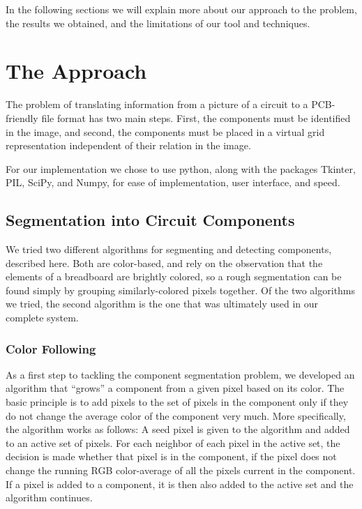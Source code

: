 \documentclass[10pt,twocolumn,letterpaper]{article}
\begin{document}
In the following sections we will explain more about our approach to
the problem, the results we obtained, and the limitations of our tool
and techniques.

\section{The Approach}

The problem of translating information from a picture of a circuit to a
PCB-friendly file format has two main steps. First, the components must be
identified in the image, and second, the components must be placed in a virtual
grid representation independent of their relation in the image. 

For our implementation we chose to use python, along with the packages
Tkinter, PIL, SciPy, and Numpy, for ease of implementation, user
interface, and speed.

\subsection{Segmentation into Circuit Components}

We tried two different algorithms for segmenting and detecting
components, described here. Both are color-based, and rely on the
observation that the elements of a breadboard are brightly colored, so
a rough segmentation can be found simply by grouping similarly-colored
pixels together. Of the two algorithms we tried, the second algorithm
is the one that was ultimately used in our complete system.

\subsubsection{Color Following}

As a first step to tackling the component segmentation problem, we
developed an algorithm that ``grows'' a component from a given pixel
based on its color. The basic principle is to add pixels to the set of
pixels in the component only if they do not change the average color
of the component very much. More specifically, the algorithm works as
follows: A seed pixel is given to the algorithm and added to an active
set of pixels. For each neighbor of each pixel in the active set, the
decision is made whether that pixel is in the component, if the pixel
does not change the running RGB color-average of all the pixels
current in the component. If a pixel is added to a component, it is
then also added to the active set and the algorithm continues.
\end{document}
